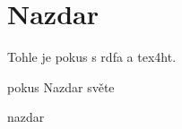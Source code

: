 \documentclass{article}
\begin{document}
\section{Nazdar}

Tohle je pokus s rdfa a tex4ht. 

\begin{subject}{pokus}
Nazdar světe

\begin{subject}{nazdar}
\end{subject}

\end{subject}
\end{document}
